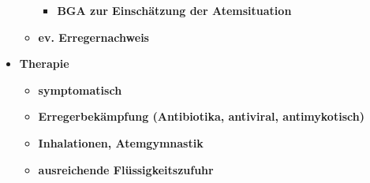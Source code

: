 \begin{itemize}
\begin{itemize}
\begin{itemize}
							\item \textbf{BGA zur Einschätzung der Atemsituation}
						\end{itemize}
					\item \textbf{ev. Erregernachweis}
				\end{itemize}
			\item \textbf{Therapie}
				\begin{itemize}
					\item \textbf{symptomatisch}
					\item \textbf{Erregerbekämpfung (Antibiotika, antiviral, antimykotisch)}
					\item \textbf{Inhalationen, Atemgymnastik}
					\item \textbf{ausreichende Flüssigkeitszufuhr}
				\end{itemize}
		\end{itemize}
